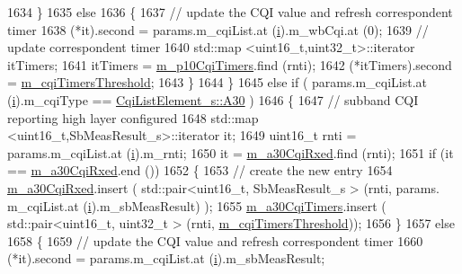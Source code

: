 \begin{DoxyCode}
1634             \}
1635           \textcolor{keywordflow}{else}
1636             \{
1637               \textcolor{comment}{// update the CQI value and refresh correspondent timer}
1638               (*it).second = params.m\_cqiList.at (\hyperlink{bernuolliDistribution_8m_a6f6ccfcf58b31cb6412107d9d5281426}{i}).m\_wbCqi.at (0);
1639               \textcolor{comment}{// update correspondent timer}
1640               std::map <uint16\_t,uint32\_t>::iterator itTimers;
1641               itTimers = \hyperlink{classns3_1_1FdTbfqFfMacScheduler_a9ef02ee999e33adc46b3ab820ea6450d}{m\_p10CqiTimers}.find (rnti);
1642               (*itTimers).second = \hyperlink{classns3_1_1FdTbfqFfMacScheduler_a5699ce6b376d8919bd386101b5c55e4a}{m\_cqiTimersThreshold};
1643             \}
1644         \}
1645       \textcolor{keywordflow}{else} \textcolor{keywordflow}{if} ( params.m\_cqiList.at (\hyperlink{bernuolliDistribution_8m_a6f6ccfcf58b31cb6412107d9d5281426}{i}).m\_cqiType == \hyperlink{structns3_1_1CqiListElement__s_a8f1bd827fd9842e7c07e39265d88299aab9a9d64494e36c89d7932a00edb056a7}{CqiListElement\_s::A30} )
1646         \{
1647           \textcolor{comment}{// subband CQI reporting high layer configured}
1648           std::map <uint16\_t,SbMeasResult\_s>::iterator it;
1649           uint16\_t rnti = params.m\_cqiList.at (\hyperlink{bernuolliDistribution_8m_a6f6ccfcf58b31cb6412107d9d5281426}{i}).m\_rnti;
1650           it = \hyperlink{classns3_1_1FdTbfqFfMacScheduler_a2c52c04323552283ec3f14a7ce083bc2}{m\_a30CqiRxed}.find (rnti);
1651           \textcolor{keywordflow}{if} (it == \hyperlink{classns3_1_1FdTbfqFfMacScheduler_a2c52c04323552283ec3f14a7ce083bc2}{m\_a30CqiRxed}.end ())
1652             \{
1653               \textcolor{comment}{// create the new entry}
1654               \hyperlink{classns3_1_1FdTbfqFfMacScheduler_a2c52c04323552283ec3f14a7ce083bc2}{m\_a30CqiRxed}.insert ( std::pair<uint16\_t, SbMeasResult\_s > (rnti, params.
      m\_cqiList.at (\hyperlink{bernuolliDistribution_8m_a6f6ccfcf58b31cb6412107d9d5281426}{i}).m\_sbMeasResult) );
1655               \hyperlink{classns3_1_1FdTbfqFfMacScheduler_a64ea10738e270f2cbb6d456c3851fcef}{m\_a30CqiTimers}.insert ( std::pair<uint16\_t, uint32\_t > (rnti, 
      \hyperlink{classns3_1_1FdTbfqFfMacScheduler_a5699ce6b376d8919bd386101b5c55e4a}{m\_cqiTimersThreshold}));
1656             \}
1657           \textcolor{keywordflow}{else}
1658             \{
1659               \textcolor{comment}{// update the CQI value and refresh correspondent timer}
1660               (*it).second = params.m\_cqiList.at (\hyperlink{bernuolliDistribution_8m_a6f6ccfcf58b31cb6412107d9d5281426}{i}).m\_sbMeasResult;

\end{DoxyCode}
